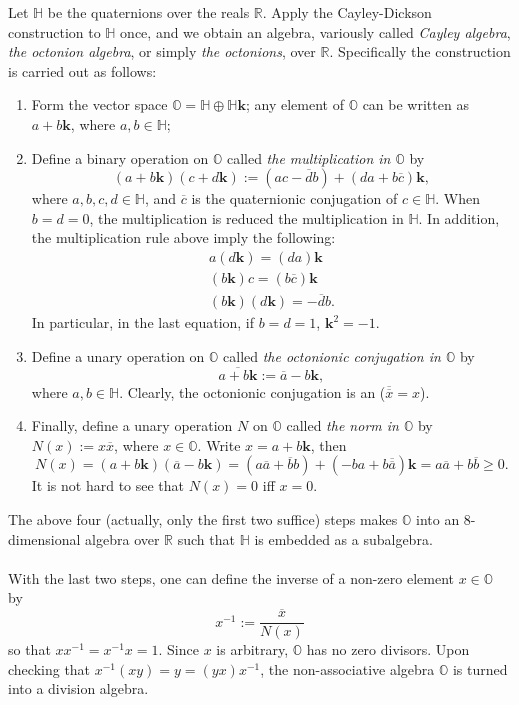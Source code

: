 \documentclass[12pt]{article}
\newcommand{\R}{\mathbb{R}}
\newcommand{\Q}{\mathbb{H}}
\newcommand{\Oc}{\mathbb{O}}
\newcommand{\conj}[1]{\overline{#1}}
\begin{document}
Let $\Q$ be the quaternions over the reals $\R$.  Apply the
Cayley-Dickson construction to $\Q$ once, and we obtain an algebra,
variously called \emph{Cayley algebra}, \emph{the octonion algebra}, or simply \emph{the octonions}, over $\R$.  Specifically the construction is carried out as follows:
\begin{enumerate}
\item Form the vector space $\Oc=\Q\oplus\Q\mathbf{k}$; any element of
$\Oc$ can be written as $a+b\mathbf{k}$, where $a,b\in\Q$;
\item Define a binary operation on $\Oc$ called \emph{the multiplication in
$\Oc$} by
$$(a+b\mathbf{k})(c+d\mathbf{k}):=(ac-\conj{d}b)+(da+b\conj{c})\mathbf{k},$$
where $a,b,c,d\in\Q$, and $\conj{c}$ is the quaternionic conjugation
of $c\in\Q$. When $b=d=0$, the multiplication is reduced the
multiplication in $\Q$. In addition, the multiplication rule above
imply the following:
\begin{eqnarray}
a(d\mathbf{k})=(da)\mathbf{k} \\
(b\mathbf{k})c=(b\conj{c})\mathbf{k} \\
(b\mathbf{k})(d\mathbf{k})=-\conj{d}b.
\end{eqnarray}
In particular, in the last equation, if $b=d=1$, $\mathbf{k}^2=-1$.
\item Define a unary operation on $\Oc$ called \emph{the octonionic
conjugation in $\Oc$} by
$$\overline{a+b\mathbf{k}}:=\conj{a}-b\mathbf{k},$$  where $a,b\in\Q$.
Clearly, the octonionic conjugation is an 
($\overline{\conj{x}}=x$).
\item Finally, define a unary operation $N$ on $\Oc$ called \emph{the norm in
$\Oc$} by $N(x):=x\conj{x}$, where $x\in\Oc$. Write
$x=a+b\mathbf{k}$, then $$N(x)=(a+b\mathbf{k})(\conj{a}-b\mathbf{k})
=(a\conj{a}+\conj{b}b)+(-ba+b\conj{\conj{a}})\mathbf{k}=
a\conj{a}+b\conj{b}\ge0.$$
It is not hard to see that $N(x)=0$ iff $x=0$.
\end{enumerate}
The above four (actually, only the first two suffice) steps makes
$\Oc$ into an $8$-dimensional algebra over $\R$ such that $\Q$ is
embedded as a subalgebra.
\\\\
With the last two steps, one can define the inverse of a non-zero
element $x\in\Oc$ by $$x^{-1}:=\frac{\conj{x}}{N(x)}$$ so that
$xx^{-1}=x^{-1}x=1$.  Since $x$ is arbitrary, $\Oc$ has no zero
divisors.  Upon checking that $x^{-1}(xy)=y=(yx)x^{-1}$, the non-associative algebra $\Oc$ is turned into a division algebra.
\end{document}
